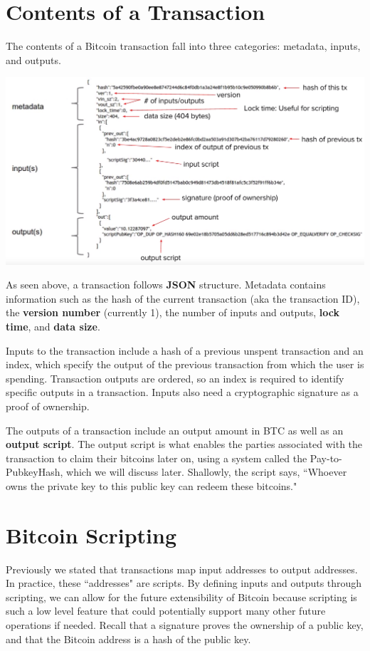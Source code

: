 \documentclass[full.tex]{subfiles}
\begin{document}
    \section*{Contents of a Transaction}
    
    The contents of a Bitcoin transaction fall into three categories: metadata, inputs, and outputs.
    
   \includegraphics[scale=0.3]{transaction_contents}
   
   As seen above, a transaction follows \textbf{JSON} structure. Metadata contains information such as the hash of the current transaction (aka the transaction ID), the \textbf{version number} (currently 1), the number of inputs and outputs, \textbf{lock time}, and \textbf{data size}.
   
   Inputs to the transaction include a hash of a previous unspent transaction and an index, which specify the output of the previous transaction from which the user is spending. Transaction outputs are ordered, so an index is required to identify specific outputs in a transaction. Inputs also need a cryptographic signature as a proof of ownership. 
   
   The outputs of a transaction include an output amount in BTC as well as an \textbf{output script}. The output script is what enables the parties associated with the transaction to claim their bitcoins later on, using a system called the Pay-to-PubkeyHash, which we will discuss later. Shallowly, the script says, ``Whoever owns the private key to this public key can redeem these bitcoins."
   
   \section*{Bitcoin Scripting}
   
   Previously we stated that transactions map input addresses to output addresses. In practice, these ``addresses" are scripts. By defining inputs and outputs through scripting, we can allow for the future extensibility of Bitcoin because scripting is such a low level feature that could potentially support many other future operations if needed. Recall that a signature proves the ownership of a public key, and that the Bitcoin address is a hash of the public key.
   
\end{document}
